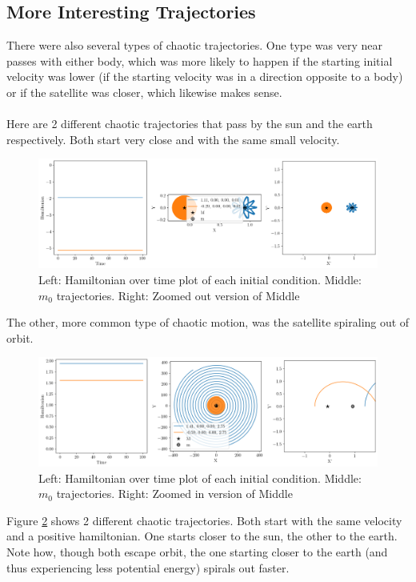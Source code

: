 \documentclass[11pt]{article}
\begin{document}
\subsection{More Interesting Trajectories}

There were also several types of chaotic trajectories. One type was very near passes with either body, which was more likely to happen if the starting initial velocity was lower (if the starting velocity was in a direction opposite to a body) or if the satellite was closer, which likewise makes sense. 
\\
\\
\noindent
Here are 2 different chaotic trajectories that pass by the sun and the earth respectively. Both start very close and with the same small velocity.
\begin{figure}[H]
    \centering
    \includegraphics[width=0.7\linewidth]{figures/collision.png}
    \caption{Left: Hamiltonian over time plot of each initial condition. Middle: $m_0$ trajectories. Right: Zoomed out version of Middle}
    \label{fig:escape trajectories}
\end{figure}
\noindent
The other, more common type of chaotic motion, was the satellite spiraling out of orbit. 
\begin{figure}[H]
    \centering
    \includegraphics[width=0.7\linewidth]{figures/chaotic.png}
    \caption{Left: Hamiltonian over time plot of each initial condition. Middle: $m_0$ trajectories. Right: Zoomed in version of Middle}
    \label{fig:escape trajectories}
\end{figure}
\noindent
Figure \ref{fig:escape trajectories} shows 2 different chaotic trajectories. Both start with the same velocity and a positive hamiltonian. One starts closer to the sun, the other to the earth. Note how, though both escape orbit, the one starting closer to the earth (and thus experiencing less potential energy) spirals out faster.
\end{document}
